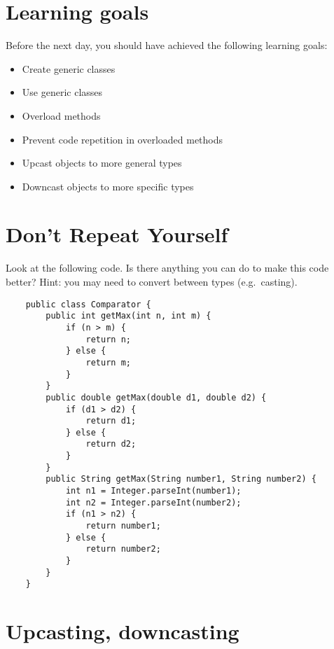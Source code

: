 \documentclass{article}
\begin{document}
\section*{Learning goals}
\label{sec:learning-goals}

Before the next day, you should have achieved the following learning
goals: 

\begin{itemize}
\item Create generic classes
\item Use generic classes
\item Overload methods
\item Prevent code repetition in overloaded methods
\item Upcast objects to more general types
\item Downcast objects to more specific types
\end{itemize}

\section{Don't Repeat Yourself}
\label{sec:dont-repeat-yourself}

Look at the following code. Is there anything you can do to make this
code better? Hint: you may need to convert between types
(e.g.~casting). 

\begin{verbatim}
    public class Comparator {
        public int getMax(int n, int m) {
            if (n > m) {
                return n;
            } else {
                return m;
            }
        }
        public double getMax(double d1, double d2) {
            if (d1 > d2) {
                return d1;
            } else {
                return d2;
            }
        }
        public String getMax(String number1, String number2) {
            int n1 = Integer.parseInt(number1);
            int n2 = Integer.parseInt(number2);
            if (n1 > n2) {
                return number1;
            } else {
                return number2;
            }
        }
    }
\end{verbatim}


\section{Upcasting, downcasting}
\label{sec:upcast-downc}
\end{document}
